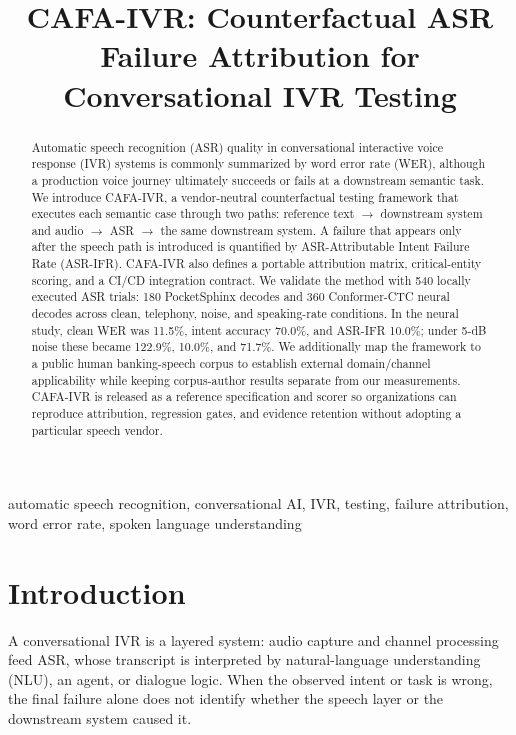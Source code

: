 \documentclass[conference]{IEEEtran}
\title{CAFA-IVR: Counterfactual ASR Failure Attribution for Conversational IVR Testing}
\author{\IEEEauthorblockN{Vijay Kumar Sridharan}
\IEEEauthorblockA{IEEE Senior Member\\
Frisco, TX, USA\\
sridharanvijaykumar@gmail.com}}
\begin{document}
\maketitle

\begin{abstract}
Automatic speech recognition (ASR) quality in conversational interactive voice response (IVR) systems is commonly summarized by word error rate (WER), although a production voice journey ultimately succeeds or fails at a downstream semantic task. We introduce CAFA-IVR, a vendor-neutral counterfactual testing framework that executes each semantic case through two paths: reference text $\rightarrow$ downstream system and audio $\rightarrow$ ASR $\rightarrow$ the same downstream system. A failure that appears only after the speech path is introduced is quantified by ASR-Attributable Intent Failure Rate (ASR-IFR). CAFA-IVR also defines a portable attribution matrix, critical-entity scoring, and a CI/CD integration contract. We validate the method with 540 locally executed ASR trials: 180 PocketSphinx decodes and 360 Conformer-CTC neural decodes across clean, telephony, noise, and speaking-rate conditions. In the neural study, clean WER was 11.5\%, intent accuracy 70.0\%, and ASR-IFR 10.0\%; under 5-dB noise these became 122.9\%, 10.0\%, and 71.7\%. We additionally map the framework to a public human banking-speech corpus to establish external domain/channel applicability while keeping corpus-author results separate from our measurements. CAFA-IVR is released as a reference specification and scorer so organizations can reproduce attribution, regression gates, and evidence retention without adopting a particular speech vendor.
\end{abstract}

\begin{IEEEkeywords}
automatic speech recognition, conversational AI, IVR, testing, failure attribution, word error rate, spoken language understanding
\end{IEEEkeywords}

\section{Introduction}
A conversational IVR is a layered system: audio capture and channel processing feed ASR, whose transcript is interpreted by natural-language understanding (NLU), an agent, or dialogue logic. When the observed intent or task is wrong, the final failure alone does not identify whether the speech layer or the downstream system caused it.
\end{document}
